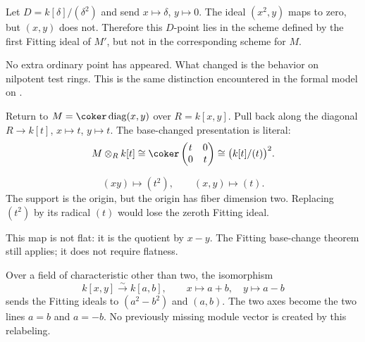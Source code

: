 Let $D=k[\delta]/(\delta^2)$ and send $x\mapsto\delta$, $y\mapsto0$. The ideal $(x^2,y)$ maps to zero, but $(x,y)$ does not. Therefore this $D$-point lies in the scheme defined by the first Fitting ideal of $M'$, but not in the corresponding scheme for $M$.

No extra ordinary point has appeared. What changed is the behavior on nilpotent test rings. This is the same distinction encountered in the formal model on .


Return to $M=\coker\operatorname{diag}(x,y)$ over $R=k[x,y]$. Pull back along the diagonal $R\to k[t]$, $x\mapsto t$, $y\mapsto t$. The base-changed presentation is literal:
\[
M\otimes_R k[t]\cong\coker\begin{pmatrix}t&0\\0&t\end{pmatrix}
\cong\bigl(k[t]/(t)\bigr)^2.
\]

\begin{minipage}[c]{.44\linewidth}
\end{minipage}\hfill
\begin{minipage}[c]{.51\linewidth}
\[
(xy)\longmapsto(t^2),\qquad
(x,y)\longmapsto(t).
\]
The support is the origin, but the origin has fiber dimension two. Replacing $(t^2)$ by its radical $(t)$ would lose the zeroth Fitting ideal.

This map is not flat: it is the quotient by $x-y$. The Fitting base-change theorem still applies; it does not require flatness.
\end{minipage}

Over a field of characteristic other than two, the isomorphism
\[
k[x,y]\xrightarrow{\sim}k[a,b],\qquad x\mapsto a+b,\quad y\mapsto a-b
\]
sends the Fitting ideals to $(a^2-b^2)$ and $(a,b)$. The two axes become the two lines $a=b$ and $a=-b$. No previously missing module vector is created by this relabeling.

